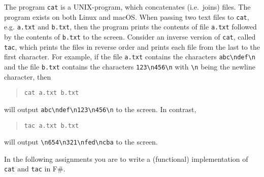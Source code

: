 The program \lstinline[language=console]{cat} is a UNIX-program, which concatenates (i.e.\ joins) files. The program exists on both Linux and macOS. When passing two text files to \lstinline[language=console]{cat}, e.g. \lstinline[language=console]{a.txt} and \lstinline[language=console]{b.txt}, then the program prints the contents of file \lstinline[language=console]{a.txt} followed by the contents of \lstinline[language=console]{b.txt} to the screen. Consider an inverse version of \texttt{cat}, called \texttt{tac}, which prints the files in reverse order and prints each file from the last to the first character. For example, if the file \lstinline[language=console]{a.txt} contains the characters \lstinline[language=console]{abc\ndef\n} and the file \lstinline[language=console]{b.txt} contains the characters \lstinline[language=console]{123\n456\n} with \lstinline[language=console]{\n} being the newline character, then
\begin{quote}
\lstinline[language=console]{cat a.txt b.txt}
\end{quote}
will output \lstinline[language=console]{abc\ndef\n123\n456\n} to the screen. In contrast,
\begin{quote}
\lstinline[language=console]{tac a.txt b.txt}
\end{quote}
will output \lstinline[language=console]{\n654\n321\nfed\ncba} to the screen.

In the following assignments you are to write a (functional) implementation of \lstinline[language=console]{cat} and \lstinline[language=console]{tac} in F\#.

